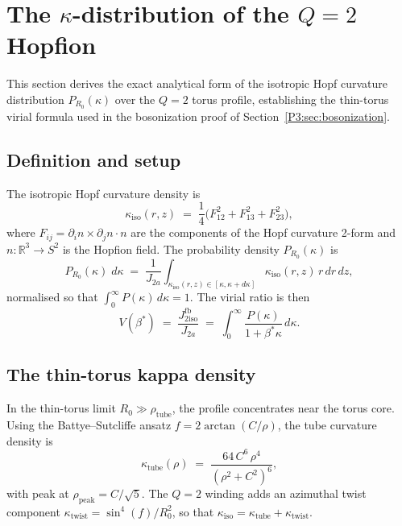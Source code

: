\documentclass[11pt,a4paper]{article}
\theoremstyle{definition}
\theoremstyle{remark}
\newcommand{\bst}{\beta^{*}}
\newcommand{\Jfb}{J_{2\mathrm{iso}}^{\mathrm{fb}}}
\newcommand{\Ja}{J_{2a}}
\newcommand{\kk}{\kappa}
\begin{document}
\section{The $\kk$-distribution of the $Q=2$ Hopfion}
\label{P3:sec:kappa}

This section derives the exact analytical form of the isotropic
Hopf curvature distribution $P_{R_0}(\kk)$ over the $Q=2$ torus profile,
establishing the thin-torus virial formula used in the bosonization
proof of Section~\ref{P3:sec:bosonization}.

\subsection{Definition and setup}

The isotropic Hopf curvature density is
\begin{equation}
  \kk_{\mathrm{iso}}(r,z)
  \;=\; \frac{1}{4}\bigl(F_{12}^2 + F_{13}^2 + F_{23}^2\bigr),
  \label{P3:eq:kappa_def}
\end{equation}
where $F_{ij} = \partial_i n \times \partial_j n \cdot n$ are the
components of the Hopf curvature 2-form and $n: \mathbb{R}^3\to S^2$
is the Hopfion field.  The probability density $P_{R_0}(\kk)$ is
\begin{equation}
  P_{R_0}(\kk) \;d\kk
  \;=\; \frac{1}{J_{2a}}\int_{\kk_{\mathrm{iso}}(r,z)\in[\kk,\kk+d\kk]}
        \kk_{\mathrm{iso}}(r,z)\,r\,dr\,dz,
  \label{P3:eq:Pkappa_def}
\end{equation}
normalised so that $\int_0^\infty P(\kk)\,d\kk = 1$.  The virial ratio
is then
\begin{equation}
  V(\bst)
  \;=\; \frac{\Jfb}{\Ja}
  \;=\; \int_0^\infty \frac{P(\kk)}{1+\bst\kk}\,d\kk.
  \label{P3:eq:V_integral}
\end{equation}

\subsection{The thin-torus kappa density}

In the thin-torus limit $R_0 \gg \rho_{\mathrm{tube}}$, the profile
concentrates near the torus core.  Using the Battye--Sutcliffe ansatz
$f = 2\arctan(C/\rho)$, the tube curvature density is
\begin{equation}
  \kk_{\mathrm{tube}}(\rho)
  \;=\; \frac{64\,C^6\,\rho^4}{(\rho^2+C^2)^6},
  \label{P3:eq:kappa_torus}
\end{equation}
with peak at $\rho_{\mathrm{peak}} = C/\sqrt{5}$.
The $Q=2$ winding adds an azimuthal twist component
$\kk_{\mathrm{twist}} = \sin^4(f)/R_0^2$, so that
$\kk_{\mathrm{iso}} = \kk_{\mathrm{tube}} + \kk_{\mathrm{twist}}$.
\end{document}
